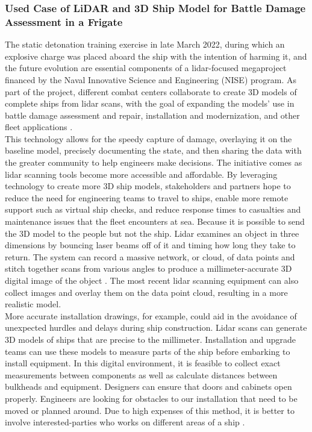 \subsubsection{Used Case of LiDAR and 3D Ship Model for Battle Damage Assessment in a Frigate}


The static detonation training exercise in late March 2022, during which an explosive charge was placed aboard the ship with the intention of harming it, and the future evolution are essential components of a lidar-focused megaproject financed by the Naval Innovative Science and Engineering (NISE) program. As part of the project, different combat centers collaborate to create 3D models of complete ships from lidar scans, with the goal of expanding the models' use in battle damage assessment and repair, installation and modernization, and other fleet applications \cite{defenseadvancement}. \\
This technology allows for the speedy capture of damage, overlaying it on the baseline model, precisely documenting the state, and then sharing the data with the greater community to help engineers make decisions. The initiative comes as lidar scanning tools become more accessible and affordable. By leveraging technology to create more 3D ship models, stakeholders and partners hope to reduce the need for engineering teams to travel to ships, enable more remote support such as virtual ship checks, and reduce response times to casualties and maintenance issues that the fleet encounters at sea. Because it is possible to send the 3D model to the people but not the ship. Lidar examines an object in three dimensions by bouncing laser beams off of it and timing how long they take to return. The system can record a massive network, or cloud, of data points and stitch together scans from various angles to produce a millimeter-accurate 3D digital image of the object \cite{LidarSolutionforship, deems2013lidar}. The most recent lidar scanning equipment can also collect images and overlay them on the data point cloud, resulting in a more realistic model. \\
More accurate installation drawings, for example, could aid in the avoidance of unexpected hurdles and delays during ship construction. Lidar scans can generate 3D models of ships that are precise to the millimeter. Installation and upgrade teams can use these models to measure parts of the ship before embarking to install equipment. In this digital environment, it is feasible to collect exact measurements between components as well as calculate distances between bulkheads and equipment. Designers can ensure that doors and cabinets open properly.  Engineers are looking for obstacles to our installation that need to be moved or planned around. Due to high expenses of this method, it is better to involve interested-parties who works on different areas of a ship \cite{defenseadvancement}. 
